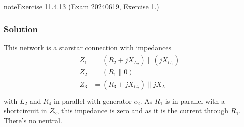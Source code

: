 \documentclass[letterpaper,10pt,english]{jupyterBook}
\begin{document}
\begin{sphinxadmonition}{note}{Exercise 11.4.13 (Exam 2024\sphinxhyphen{}06\sphinxhyphen{}19, Exercise 1.)}



\begin{figure}[htbp]
\centering

\noindent{}
\end{figure}
\subsubsection*{Solution}

\sphinxAtStartPar
This network is a star\sphinxhyphen{}star connection with impedances
\begin{equation*}
\begin{split}\begin{aligned}
  Z_1 & = ( R_2 + j X_{L_2} ) \parallel ( j X_{C_1} ) \\
  Z_2 & = ( R_1 \parallel 0 ) \\
  Z_3 & = ( R_3 + j X_{C_2} ) \parallel j X_{L_1} \\
\end{aligned}\end{split}
\end{equation*}
\sphinxAtStartPar
with \(L_2\) and \(R_4\) in parallel with generator \(e_2\). As \(R_1\) is in parallel with a short\sphinxhyphen{}circuit in \(Z_2\), this impedance is zero and as it is the current through \(R_1\). There’s no neutral.


\end{sphinxadmonition}
\end{document}
